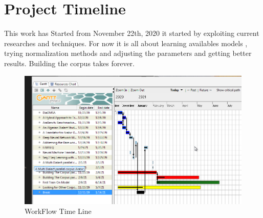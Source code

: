 \documentclass[paper=a4, fontsize=11pt]{scrartcl}
\numberwithin{equation}{section}		%
\numberwithin{figure}{section}			%
\numberwithin{table}{section}				%
\begin{document}
\pagebreak
\section{Project Timeline}
This work has Started from November 22th, 2020 it started by exploiting current researches and techniques. For now it is all about learning availables models , trying normalization methods and adjusting the parameters and getting better results.  Building the corpus takes forever. \\ 


\begin{figure}
    \centering
    \includegraphics[height=0.55\textwidth]{Figs/dd.png}
    \caption{WorkFlow Time Line}
    \label{fig:my_label}
\end{figure}

\pagebreak


\end{document}
